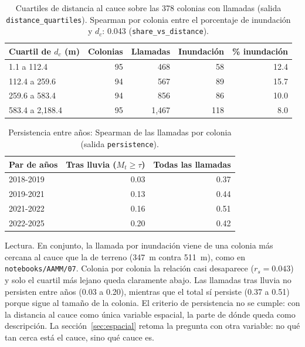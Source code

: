 \documentclass[11pt]{article}
\newcommand{\cod}[1]{\nolinkurl{#1}}
\begin{document}
\begin{table}[!htbp]
  \centering
  \small
  \caption{Cuartiles de distancia al cauce sobre las 378 colonias con llamadas (salida \cod{distance_quartiles}). Spearman por colonia entre el porcentaje de inundación y $d_c$: 0.043 (\cod{share_vs_distance}).}
  \label{tab:e4-cuartil}
  \begin{tabular}{lrrrr}
    \toprule
    Cuartil de $d_c$ (m) & Colonias & Llamadas & Inundación & \% inundación \\
    \midrule
    1.1 a 112.4 & 95 & 468 & 58 & 12.4 \\
    112.4 a 259.6 & 94 & 567 & 89 & 15.7 \\
    259.6 a 583.4 & 94 & 856 & 86 & 10.0 \\
    583.4 a 2,188.4 & 95 & 1,467 & 118 & 8.0 \\
    \bottomrule
  \end{tabular}
\end{table}

\begin{table}[!htbp]
  \centering
  \small
  \caption{Persistencia entre años: Spearman de las llamadas por colonia (salida \cod{persistence}).}
  \label{tab:e4-persistencia}
  \begin{tabular}{lrr}
    \toprule
    Par de años & Tras lluvia ($M_t\ge\tau$) & Todas las llamadas \\
    \midrule
    2018-2019 & 0.03 & 0.37 \\
    2019-2021 & 0.13 & 0.44 \\
    2021-2022 & 0.16 & 0.51 \\
    2022-2025 & 0.20 & 0.42 \\
    \bottomrule
  \end{tabular}
\end{table}

Lectura. En conjunto, la llamada por inundación viene de una colonia más cercana al cauce que la de terreno (347~m contra 511~m), como en \cod{notebooks/AAMM/07}. Colonia por colonia la relación casi desaparece ($r_s=0.043$) y solo el cuartil más lejano queda claramente abajo. Las llamadas tras lluvia no persisten entre años (0.03 a 0.20), mientras que el total sí persiste (0.37 a 0.51) porque sigue al tamaño de la colonia. El criterio de persistencia no se cumple: con la distancia al cauce como única variable espacial, la parte de dónde queda como descripción. La sección~\ref{sec:espacial} retoma la pregunta con otra variable: no qué tan cerca está el cauce, sino qué cauce es.
\end{document}
